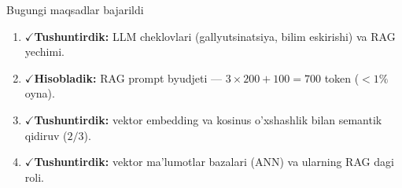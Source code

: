 \documentclass[aspectratio=169,11pt]{beamer}
\newcommand{\bajarildi}{{\color{deepgreen}\large$\checkmark$}\;}
\begin{document}
\begin{frame}{Bugungi maqsadlar bajarildi}
  \begin{enumerate}\setlength\itemsep{7pt}
    \item \bajarildi \textbf{Tushuntirdik:} LLM cheklovlari (gallyutsinatsiya,
          bilim eskirishi) va RAG yechimi.
    \item \bajarildi \textbf{Hisobladik:} RAG prompt byudjeti --- $3\times 200 +
          100 = 700$ token ($<1\%$ oyna).
    \item \bajarildi \textbf{Tushuntirdik:} vektor embedding va kosinus
          o'xshashlik bilan semantik qidiruv ($2/3$).
    \item \bajarildi \textbf{Tushuntirdik:} vektor ma'lumotlar bazalari (ANN)
          va ularning RAG dagi roli.
  \end{enumerate}
\end{frame}
\end{document}
